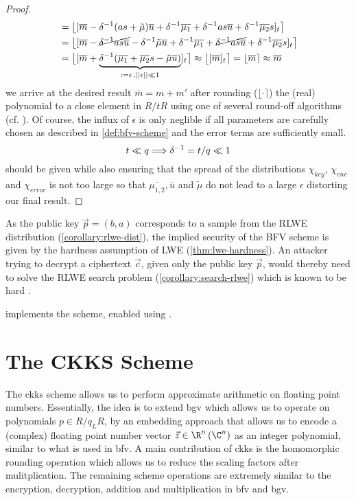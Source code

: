 \begin{proof}
\begin{align*}
     & = \big\lfloor [\overline{m} - \delta^{-1} (as + \tilde{\mu}) \overline{u} + \delta^{-1} \overline{\mu_1} + \delta^{-1} a s \overline{u} + \delta^{-1} \overline{\mu_2} s]_t \big\rceil                                        \\
     & = \big\lfloor [\overline{m} - \cancel{\delta^{-1} as \overline{u}} - \delta^{-1} \tilde{\mu} \overline{u} + \delta^{-1} \overline{\mu_1} + \cancel{\delta^{-1} as \overline{u}} + \delta^{-1} \overline{\mu_2} s]_t \big\rceil \\
     & = \big\lfloor [\overline{m} + \underbrace{\delta^{-1} (\overline{\mu_1} + \overline{\mu_2} s - \tilde{\mu} \overline{u})}_{:= \epsilon \,, ||\epsilon|| \ll 1}]_t \big\rceil
    \approx \big\lfloor [\overline{m}]_t \big\rceil = \lfloor \overline{m} \rceil \approx \overline{m}
  \end{align*}
  we arrive at the desired result $\overline{m} = m + m'$ after rounding ($\lfloor \cdot \rceil$) the (real) polynomial to a close element in $R/tR$ using one of several round-off algorithms  (cf. \cite{2013-rlwe-toolkit}).
  Of course, the influx of $\epsilon$ is only neglible if all parameters are carefully chosen as described in \cref{def:bfv-scheme} and the error terms are sufficiently small.
  $$t \ll q \Longrightarrow \delta^{-1} = t/q \ll 1$$ should be given while also ensuring that the spread of the distributions $\chi_{key}$, $\chi_{enc}$ and $\chi_{error}$ is not too large so that $\overline{\mu_{1,2}}, \overline{u}$ and $\tilde{\mu}$ do not lead to a large $\epsilon$ distorting our final result.
\end{proof}

As the public key $\vec{p} = (b, a)$ corresponds to a sample from the RLWE distribution (\cref{corollary:rlwe-dist}), the implied security of the BFV scheme is given by the hardness assumption of LWE (\cref{thm:lwe-hardness}).
An attacker trying to decrypt a ciphertext $\vec{c}$, given only the public key $\vec{p}$, would thereby need to solve the RLWE search problem (\cref{corollary:search-rlwe}) which is known to be hard \parencite{2010-rlwe-original}.

\cite{seal-4.0} implements the scheme, enabled using .

\pagebreak
\section{The CKKS Scheme}
\label{sec:ckks}
The \gls{ckks} scheme allows us to perform approximate arithmetic on floating point numbers.
Essentially, the idea is to extend \gls{bgv} which allows us to operate on polynomials $p \in R/q_L R$, by an embedding approach that allows us to encode a (complex) floating point number vector $\vec{z} \in \R^n\, (\C^n)$ as an integer polynomial, similar to what is used in \gls{bfv}.
A main contribution of \gls{ckks} is the homomorphic rounding operation which allows us to reduce the scaling factors after mulitplication.
The remaining scheme operations are extremely similar to the encryption, decryption, addition and multiplication in \gls{bfv} and \gls{bgv}.

